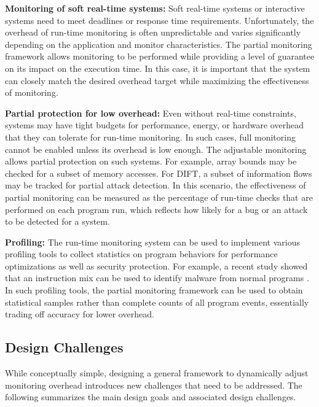{\bf Monitoring of soft real-time systems:}
Soft real-time systems or interactive systems need to meet deadlines or response
time requirements. Unfortunately, the overhead of run-time monitoring is often 
unpredictable and varies significantly depending on the application and monitor
characteristics. The partial monitoring framework allows monitoring to be performed
while providing a level of guarantee on its impact on the execution time. 
In this case, it is important that the system can closely match the desired
overhead target while maximizing the effectiveness of monitoring.

{\bf Partial protection for low overhead:}
Even without real-time constraints, systems may have tight budgets for performance,
energy, or hardware overhead that they can tolerate for run-time monitoring. In such cases,
full monitoring cannot be enabled unless its overhead is low enough. The adjustable
monitoring allows partial protection on such systems. For example, array bounds
may be checked for a subset of memory accesses. For DIFT, a subset of information flows
may be tracked for partial attack detection. In this scenario, the effectiveness of 
partial monitoring can be measured as the percentage of run-time checks that are
performed on each program run, which reflects how likely for a bug or an attack 
to be detected for a system. 

{\bf Profiling:} 
The run-time monitoring system can be used to implement various profiling tools
to collect statistics on program behaviors for performance optimizations as well
as security protection. For example, a recent study showed that an instruction
mix can be used to identify malware from normal programs \cite{demme-isca13, tang-raid14}. 
In such profiling tools, the partial monitoring framework can be used to obtain
statistical samples rather than complete counts of all program events, essentially trading off
accuracy for lower overhead.

\subsection{Design Challenges}

While conceptually simple, designing a general framework to dynamically adjust monitoring
overhead introduces new challenges that need to be addressed.  
The following summarizes the main design goals and associated design challenges.

